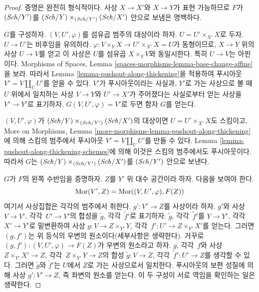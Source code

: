 \begin{proof}
증명은 완전히 형식적이다. 사상 $X \to X'$와 $X \to Y$가
표현 가능하므로 $F$가 $(\mathit{Sch}/Y')$를
$(\mathit{Sch}/Y) \times_{(\mathit{Sch}/Y')} (\mathit{Sch}/X')$ 안으로 보냄은 명백하다.

\medskip\noindent
$G$를 구성하자. $(V, U', \varphi)$를 섬유곱 범주의 대상이라 하자.
$U = U' \times_{X'} X$로 두자. $U \to U'$는 비후임을 유의하라.
$\varphi : V \times_Y X \to U' \times_{X'} X = U$가 동형이므로,
$X \to Y$ 위의 사상 $U \to V$를 얻고 이 사상은
$U$를 섬유곱 $X \times_Y V$와 동일시한다.
특히 $U \to V$는 아핀이다. Morphisms of Spaces, Lemma
\ref{spaces-morphisms-lemma-base-change-affine}을 보라.
따라서 Lemma \ref{lemma-pushout-along-thickening}을 적용하여
푸시아웃 $V' = V \amalg_U U'$를 얻을 수 있다.
$V'$가 푸시아웃이라는 사실과, $Y'$로 가는 사상으로 볼 때 $U$ 위에서
일치하는 사상 $V \to Y$와 $U' \to X'$가 주어졌다는 사실로부터 얻는
사상을 $V' \to Y'$로 표기하자.
$G(V, U', \varphi) = V'$로 두면 함자 $G$를 얻는다.

\medskip\noindent
$(V, U', \varphi)$가 $(\mathit{Sch}/Y) \times_{(\mathit{Sch}/Y')} (\mathit{Sch}/X')$의
대상이면 $U = U' \times_{X'} X$도 스킴이고, More on Morphisms, Lemma
\ref{more-morphisms-lemma-pushout-along-thickening}에 의해
스킴의 범주에서 푸시아웃 $V' = V \amalg_U U'$를 만들 수 있다.
Lemma \ref{lemma-pushout-along-thickening-schemes}에 의해 이것은
스킴의 범주에서도 푸시아웃이다. 따라서 $G$는
$(\mathit{Sch}/Y) \times_{(\mathit{Sch}/Y')} (\mathit{Sch}/X')$를 $(\mathit{Sch}/Y')$ 안으로 보낸다.

\medskip\noindent
$G$가 $F$의 왼쪽 수반임을 증명하자. $Z$를 $Y'$ 위 대수 공간이라 하자.
다음을 보여야 한다.
$$
\mathop{\mathrm{Mor}}\nolimits(V', Z) = \mathop{\mathrm{Mor}}\nolimits((V, U', \varphi), F(Z))
$$
여기서 사상집합은 각각의 범주에서 취한다.
$g' : V' \to Z$를 사상이라 하자.
$g'$와 사상 $V \to V'$, 각각\ $U' \to V'$의 합성을
$\tilde g$, 각각\ $\tilde f'$로 표기하자.
$\tilde g$, 각각\ $\tilde f'$를 $Y \to Y'$, 각각\ $X' \to Y'$로
밑변환하여 사상 $g : V \to Z \times_{Y'} Y$,
각각\ $f' : U' \to Z \times_{Y'} X'$를 얻는다.
그러면 $(g, f')$는 위 등식의 우변의 원소이다(세부사항은 생략한다).
거꾸로 $(g, f') : (V, U', \varphi) \to F(Z)$가 우변의 원소라고 하자.
$g$, 각각\ $f$와 사상 $Z \times_{Y'} X' \to Z$, 각각\ $Z \times_{Y'} Y \to Z$의
합성 $\tilde g : V \to Z$,
각각\ $\tilde f' : U' \to Z$를 생각할 수 있다.
그러면 $\tilde g$와 $\tilde f'$는 $U$에서 $Z$로 가는 사상으로서 일치한다.
푸시아웃의 보편 성질에 의해 사상 $g' : V' \to Z$, 즉 좌변의 원소를 얻는다.
이 두 구성이 서로 역임을 확인하는 일은 생략한다.
\end{proof}

